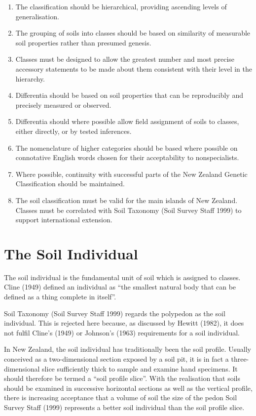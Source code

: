 \documentclass[
  letterpaper,
  DIV=11,
  numbers=noendperiod]{scrreprt}
\providecommand{\tightlist}{%
  \setlength{\itemsep}{0pt}\setlength{\parskip}{0pt}}\usepackage{longtable,booktabs,array}
\begin{document}
\begin{enumerate}
\def\labelenumi{\arabic{enumi}.}
\tightlist
\item
  The classification should be hierarchical, providing ascending levels
  of generalisation.
\item
  The grouping of soils into classes should be based on similarity of
  measurable soil properties rather than presumed genesis.
\item
  Classes must be designed to allow the greatest number and most precise
  accessory statements to be made about them consistent with their level
  in the hierarchy.
\item
  Differentia should be based on soil properties that can be
  reproducibly and precisely measured or observed.
\item
  Differentia should where possible allow field assignment of soils to
  classes, either directly, or by tested inferences.
\item
  The nomenclature of higher categories should be based where possible
  on connotative English words chosen for their acceptability to
  nonspecialists.
\item
  Where possible, continuity with successful parts of the New Zealand
  Genetic Classification should be maintained.
\item
  The soil classification must be valid for the main islands of New
  Zealand. Classes must be correlated with Soil Taxonomy (Soil Survey
  Staff 1999) to support international extension.
\end{enumerate}

\hypertarget{sec-intro-soil-indiv}{%
\section{The Soil Individual}\label{sec-intro-soil-indiv}}

The soil individual is the fundamental unit of soil which is assigned to
classes. Cline (1949) defined an individual as ``the smallest natural
body that can be defined as a thing complete in itself''.

Soil Taxonomy (Soil Survey Staff 1999) regards the polypedon as the soil
individual. This is rejected here because, as discussed by Hewitt
(1982), it does not fulfil Cline's (1949) or Johnson's (1963)
requirements for a soil individual.

In New Zealand, the soil individual has traditionally been the soil
profile. Usually conceived as a two-dimensional section exposed by a
soil pit, it is in fact a three-dimensional slice sufficiently thick to
sample and examine hand specimens. It should therefore be termed a
``soil profile slice''. With the realisation that soils should be
examined in successive horizontal sections as well as the vertical
profile, there is increasing acceptance that a volume of soil the size
of the pedon Soil Survey Staff (1999) represents a better soil
individual than the soil profile slice.
\end{document}
